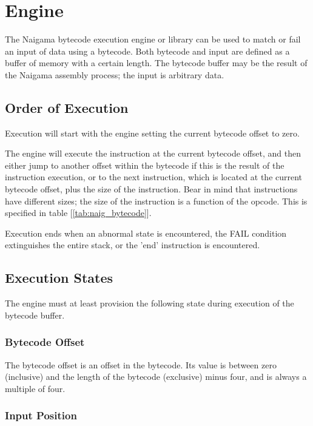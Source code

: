 \section{Engine}
\label{sec:engine}

The Naigama bytecode execution engine or library can be used to
match or fail an input of data using a bytecode.
Both bytecode and input are defined as a buffer of memory with
a certain length. The bytecode buffer may be the result of
the Naigama assembly process; the input is arbitrary data.

\subsection{Order of Execution}

Execution will start with the engine setting the current bytecode
offset to zero.

The engine will execute the instruction at the current bytecode
offset, and then either jump
to another offset within the bytecode if this is the result of
the instruction execution, or to the next instruction, which is
located at the current bytecode offset, plus the size of the
instruction. Bear in mind that instructions have different sizes;
the size of the instruction is a function of the opcode.
This is specified in table [\ref{tab:naig_bytecode}].

Execution ends when an abnormal state is encountered, the FAIL
condition extinguishes the entire stack, or the 'end' instruction
is encountered.

\subsection{Execution States}

The engine must at least provision the following state during execution
of the bytecode buffer.

\subsubsection{Bytecode Offset}

The bytecode offset is an offset in the bytecode. Its value is
between zero (inclusive) and the length of the bytecode (exclusive)
minus four, and is always a multiple of four.

\subsubsection{Input Position}

